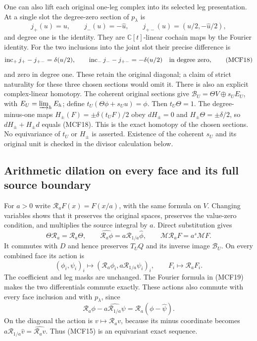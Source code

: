 One can also lift each original one-leg complex into its selected leg
presentation.  At a single slot the degree-zero section of $p_\lambda$ is
\[
j_+(u)=u,\qquad j_-(u)=-\widehat u,\qquad
j_{+-}(u)=(u/2,-\widehat u/2),
\tag{MCF17}
\]
and degree one is the identity.  They are $\mathbb C[t]$-linear cochain
maps by the Fourier identity.  For the two inclusions into the joint
slot their precise difference is
\[
\operatorname{inc}_+j_+-j_{+-}=\delta(u/2),\qquad
\operatorname{inc}_-j_--j_{+-}=-\delta(u/2)
\quad\hbox{in degree zero},
\tag{MCF18}
\]
and zero in degree one.  These retain the original diagonal; a claim of
strict naturality for these three chosen sections would omit it.
There is also an explicit complex-linear homotopy.  The coherent original
sections give $\mathscr B_U=\Theta V\oplus s_UE_U$, with
$E_U=\varinjlim_hE_h$; define $t_U(\Theta\phi+s_Uu)=\phi$.
Then $t_U\Theta=1$.  The degree-minus-one maps
$H_\pm(F)=\pm\delta(t_UF)/2$ obey $dH_\pm=0$ and
$H_\pm\Theta=\pm\delta/2$, so $dH_\pm+H_\pm d$ equals (MCF18).
This is the exact homotopy of the chosen sections.  No equivariance of
$t_U$ or $H_\pm$ is asserted.  Existence of the coherent $s_U$ and its
original unit is checked in the divisor calculation below.

\subsection{Arithmetic dilation on every face and its full source boundary}

For $a>0$ write $\mathcal R_aF(x)=F(x/a)$, with the same formula on $V$.
Changing variables shows that it preserves the original spaces, preserves
the value-zero condition, and multiplies the source integral by $a$.
Direct substitution gives
\[
\Theta\mathcal R_a=\mathcal R_a\Theta,\qquad
\widehat{\mathcal R_a\phi}=a\mathcal R_{1/a}\widehat\phi,\qquad
\mathcal M\mathcal R_aF=a^s\mathcal MF.
\tag{MCF19}
\]
It commutes with $D$ and hence preserves $T_UQ$ and its inverse image
$\mathscr B_U$.  On every combined face its action is
\[
(\phi_i,\psi_i)_i\longmapsto
 (\mathcal R_a\phi_i,a\mathcal R_{1/a}\psi_i)_i,\qquad
F_i\longmapsto\mathcal R_aF_i.
\tag{MCF20}
\]
The coefficient and leg masks are unchanged.  The Fourier formula in
(MCF19) makes the two differentials commute exactly.  These actions
also commute with every face inclusion and with $p_\lambda$, since
\[
\mathcal R_a\phi-\widehat{a\mathcal R_{1/a}\psi}
      =\mathcal R_a(\phi-\widehat\psi).
\]
On the diagonal the action is $v\mapsto\mathcal R_av$, because its
minus coordinate becomes $a\mathcal R_{1/a}\widehat v
=\widehat{\mathcal R_av}$.  Thus (MCF15) is an equivariant exact sequence.

